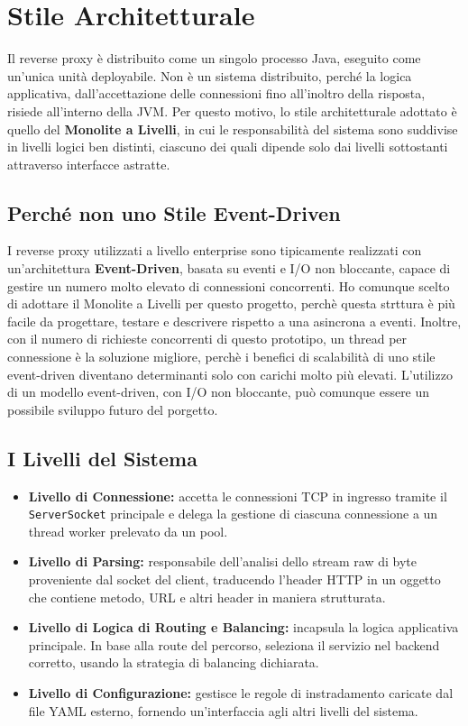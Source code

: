 \newpage
\section{Stile Architetturale}
\label{sec:architettura}
Il reverse proxy è distribuito come un singolo processo Java, eseguito come un'unica unità deployabile.
Non è un sistema distribuito, perché la logica applicativa, dall'accettazione delle connessioni fino all'inoltro della risposta, risiede all'interno della JVM.
Per questo motivo, lo stile architetturale adottato è quello del \textbf{Monolite a Livelli}, in cui le responsabilità del sistema sono suddivise in livelli logici ben distinti,
ciascuno dei quali dipende solo dai livelli sottostanti attraverso interfacce astratte.

\subsection{Perché non uno Stile Event-Driven}
I reverse proxy utilizzati a livello enterprise sono tipicamente realizzati con un'architettura \textbf{Event-Driven},
basata su eventi e I/O non bloccante, capace di gestire un numero molto elevato di connessioni concorrenti.
Ho comunque scelto di adottare il Monolite a Livelli per questo progetto, perchè questa strttura è più facile da progettare, testare e descrivere rispetto a una asincrona a eventi.
Inoltre, con il numero di richieste concorrenti di questo prototipo, un thread per connessione è la soluzione migliore, perchè i benefici di scalabilità di uno stile event-driven diventano 
determinanti solo con carichi molto più elevati.
L'utilizzo di un modello event-driven, con I/O non bloccante, può comunque essere un possibile sviluppo futuro del porgetto.

\subsection{I Livelli del Sistema}
\begin{itemize}
    \item \textbf{Livello di Connessione:} accetta le connessioni TCP in ingresso tramite il \texttt{ServerSocket} principale e delega la gestione di ciascuna connessione a un thread worker prelevato da un pool.
    \item \textbf{Livello di Parsing:} responsabile dell'analisi dello stream raw di byte proveniente dal socket del client, traducendo l'header HTTP in un oggetto che contiene metodo, URL e altri header in maniera strutturata.
    \item \textbf{Livello di Logica di Routing e Balancing:} incapsula la logica applicativa principale. In base alla route del percorso, seleziona il servizio nel backend corretto, usando la strategia di balancing dichiarata.
    \item \textbf{Livello di Configurazione:} gestisce le regole di instradamento caricate dal file YAML esterno, fornendo un'interfaccia agli altri livelli del sistema.
\end{itemize}

